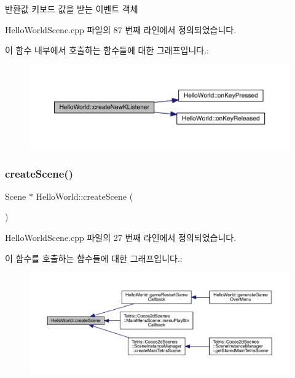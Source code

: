 \begin{DoxyReturn}{반환값}
키보드 값을 받는 이벤트 객체 
\end{DoxyReturn}


Hello\+World\+Scene.\+cpp 파일의 87 번째 라인에서 정의되었습니다.

이 함수 내부에서 호출하는 함수들에 대한 그래프입니다.\+:
\nopagebreak
\begin{figure}[H]
\begin{center}
\leavevmode
\includegraphics[width=350pt]{class_hello_world_ab43ad3eb748cab6180daf5a8cfdcf207_cgraph}
\end{center}
\end{figure}
\mbox{\label{class_hello_world_a1b700f5f9de04271533d3fa099d7b014}} 
\subsubsection{\texorpdfstring{create\+Scene()}{createScene()}}
{\footnotesize\ttfamily Scene $\ast$ Hello\+World\+::create\+Scene (\begin{DoxyParamCaption}{ }\end{DoxyParamCaption})\hspace{0.3cm}{\ttfamily [static]}}



Hello\+World\+Scene.\+cpp 파일의 27 번째 라인에서 정의되었습니다.

이 함수를 호출하는 함수들에 대한 그래프입니다.\+:
\nopagebreak
\begin{figure}[H]
\begin{center}
\leavevmode
\includegraphics[width=350pt]{class_hello_world_a1b700f5f9de04271533d3fa099d7b014_icgraph}
\end{center}
\end{figure}
\mbox{\label{class_hello_world_a0456ce3ab8880643c5e8739634156d93}} 
